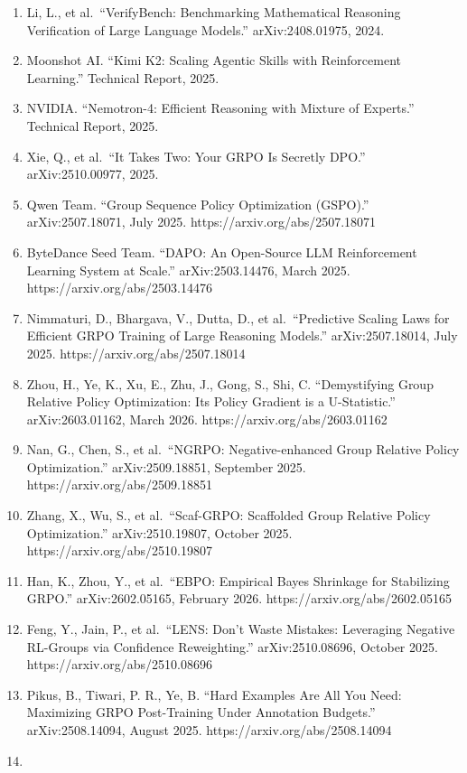\documentclass[
  american,
  11pt,
  a4paper,
  oneside]{report}
\begin{document}
\begin{enumerate}
\item
  Li, L., et al.~``VerifyBench: Benchmarking Mathematical Reasoning
  Verification of Large Language Models.'' arXiv:2408.01975, 2024.
\item
  Moonshot AI. ``Kimi K2: Scaling Agentic Skills with Reinforcement
  Learning.'' Technical Report, 2025.
\item
  NVIDIA. ``Nemotron-4: Efficient Reasoning with Mixture of Experts.''
  Technical Report, 2025.
\item
  Xie, Q., et al.~``It Takes Two: Your GRPO Is Secretly DPO.''
  arXiv:2510.00977, 2025.
\item
  Qwen Team. ``Group Sequence Policy Optimization (GSPO).''
  arXiv:2507.18071, July 2025. https://arxiv.org/abs/2507.18071
\item
  ByteDance Seed Team. ``DAPO: An Open-Source LLM Reinforcement Learning
  System at Scale.'' arXiv:2503.14476, March 2025.
  https://arxiv.org/abs/2503.14476
\item
  Nimmaturi, D., Bhargava, V., Dutta, D., et al.~``Predictive Scaling
  Laws for Efficient GRPO Training of Large Reasoning Models.''
  arXiv:2507.18014, July 2025. https://arxiv.org/abs/2507.18014
\item
  Zhou, H., Ye, K., Xu, E., Zhu, J., Gong, S., Shi, C. ``Demystifying
  Group Relative Policy Optimization: Its Policy Gradient is a
  U-Statistic.'' arXiv:2603.01162, March 2026.
  https://arxiv.org/abs/2603.01162
\item
  Nan, G., Chen, S., et al.~``NGRPO: Negative-enhanced Group Relative
  Policy Optimization.'' arXiv:2509.18851, September 2025.
  https://arxiv.org/abs/2509.18851
\item
  Zhang, X., Wu, S., et al.~``Scaf-GRPO: Scaffolded Group Relative
  Policy Optimization.'' arXiv:2510.19807, October 2025.
  https://arxiv.org/abs/2510.19807
\item
  Han, K., Zhou, Y., et al.~``EBPO: Empirical Bayes Shrinkage for
  Stabilizing GRPO.'' arXiv:2602.05165, February 2026.
  https://arxiv.org/abs/2602.05165
\item
  Feng, Y., Jain, P., et al.~``LENS: Don't Waste Mistakes: Leveraging
  Negative RL-Groups via Confidence Reweighting.'' arXiv:2510.08696,
  October 2025. https://arxiv.org/abs/2510.08696
\item
  Pikus, B., Tiwari, P. R., Ye, B. ``Hard Examples Are All You Need:
  Maximizing GRPO Post-Training Under Annotation Budgets.''
  arXiv:2508.14094, August 2025. https://arxiv.org/abs/2508.14094
\item

\end{enumerate}
\end{document}
